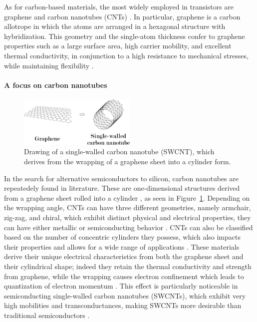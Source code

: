 As for carbon-based materials, the most widely employed in transistors are graphene \citep{krsihnaRecent2021, moonGraphene2012, reddyGraphene2011} and carbon nanotubes (CNTs) \citep{kumarCarbon2023, maqboolReview2024, shkodraElectrolytegated2021}. In particular, graphene is a carbon allotrope in which the atoms are arranged in a hexagonal structure with  hybridization. This geometry and the single-atom thickness confer to graphene properties such as a large surface area, high carrier mobility, and excellent thermal conductivity, in conjunction to a high resistance to mechanical stresses, while maintaining flexibility \citep{farjadianRecent2020, radsarGraphene2021, uradeGraphene2023}.

\paragraph{A focus on carbon nanotubes}
\begin{figure}[h]
    \centering
    \includegraphics[width=0.5\textwidth]{figures/chapter1/fet/Fig4_cntStructure.pdf}
    \caption{Drawing of a single-walled carbon nanotube (SWCNT), which derives from the wrapping of a graphene sheet into a cylinder form.}
    \label{fig:cntStructure}
\end{figure}

In the search for alternative semiconductors to silicon, carbon nanotubes are repeatedely found in literature. These are one-dimensional structures derived from a graphene sheet rolled into a cylinder \citep{iijimaHelical1991}, as seen in Figure~\ref{fig:cntStructure}. Depending on the wrapping angle, CNTs can have three different geometries, namely armchair, zig-zag, and chiral, which exhibit distinct physical and electrical properties, \eg{} they can have either metallic or semiconducting behavior \citep{dresselhausChapter1996, avourisMolecular2002, popovCarbon2004}. CNTs can also be classified based on the number of concentric cylinders they possess, which also impacts their properties and allows for a wide range of applications \citep{popovCarbon2004}. These materials derive their unique electrical characteristics from both the graphene sheet and their cylindrical shape; indeed they retain the thermal conductivity and strength from graphene, while the wrapping causes electron confinement which leads to quantization of electron momentum \citep{avourisMolecular2002, mceuenSinglewalled2002}. This effect is particularly noticeable in semiconducting single-walled carbon nanotubes (SWCNTs), which exhibit very high mobilities and transconductances, making SWCNTs more desirable than traditional semiconductors \citep{mceuenElectron2004}. 

